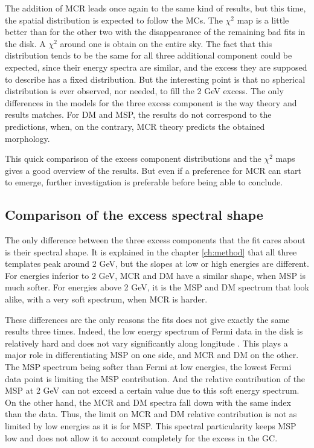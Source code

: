 The addition of MCR leads once again to the same kind of results, but this time, the spatial distribution is expected to follow the MCs. The $\chi^2$ map is a little better than for the other two with the disappearance of the remaining bad fits in the disk. A $\chi^2$ around one is obtain on the entire sky. 
The fact that this distribution tends to be the same for all three additional component could be expected, since their energy spectra are similar, and the excess they are supposed to describe has a fixed distribution. But the interesting point is that no spherical distribution is ever observed, nor needed, to fill the 2 GeV excess. 
The only differences in the models for the three excess component is the way theory and results matches. For DM and MSP, the results do not correspond to the predictions, when, on the contrary, MCR theory predicts the obtained morphology.

This quick comparison of the excess component distributions and the $\chi^2$ maps gives a good overview of the results. But even if a preference for MCR can start to emerge, further investigation is preferable before being able to conclude.


\subsection{Comparison of the excess spectral shape}

The only difference between the three excess components that the fit cares about is their spectral shape. It is explained in the chapter \ref{ch:method} that all three templates peak around 2 GeV, but the slopes at low or high energies are different. For energies inferior to 2 GeV, MCR and DM have a similar shape, when MSP is much softer. For energies above 2 GeV, it is the MSP and DM spectrum that look alike, with a very soft spectrum, when MCR is harder.

These differences are the only reasons the fits does not give exactly the same results three times.
Indeed, the low energy spectrum of Fermi data in the disk is relatively hard and does not vary significantly along longitude . This plays a major role in differentiating MSP on one side, and MCR and DM on the other. The MSP spectrum being softer than Fermi at low energies, the lowest Fermi data point is limiting the MSP contribution. And the relative contribution of the MSP at 2 GeV can not exceed a certain value due to this soft energy spectrum. On the other hand, the MCR and DM spectra fall down with the same index than the data. Thus, the limit on MCR and DM relative contribution is not as limited by low energies as it is for MSP.
This spectral particularity keeps MSP low and does not allow it to account completely for the excess in the GC.


